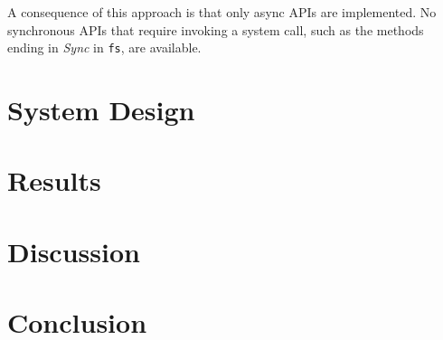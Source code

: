 \documentclass{acm_proc_article-sp}
\begin{document}
A consequence of this approach is that only async APIs are
implemented.  No synchronous APIs that require invoking a system call,
such as the methods ending in \emph{Sync} in \texttt{fs}, are
available.

\section{System Design}

\section{Results}

\section{Discussion}

\section{Conclusion}




\balancecolumns
\end{document}

